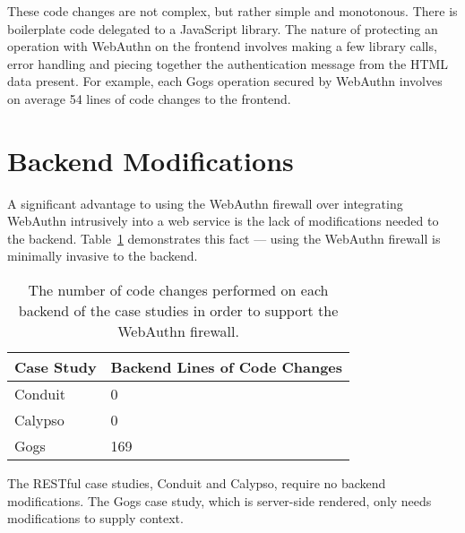 These code changes are not complex, but rather simple and monotonous. There is boilerplate code delegated to a JavaScript library. The nature of protecting an operation with WebAuthn on the frontend involves making a few library calls, error handling and piecing together the authentication message from the HTML data present. For example, each Gogs operation secured by WebAuthn involves on average 54 lines of code changes to the frontend. 




\section{Backend Modifications}\label{Sec:BackendModifications}

A significant advantage to using the WebAuthn firewall over integrating WebAuthn intrusively into a web service is the lack of modifications needed to the backend. Table~\ref{Table:EvaluationsBackendModifications} demonstrates this fact --- using the WebAuthn firewall is minimally invasive to the backend.

\begin{table}[h]
\centering

\begin{tabular}{ m{4.5cm} m{6cm}  } 
 \hline
 Case Study & Backend Lines of Code Changes \\ 
 \hline \hline

 Conduit & 0 \\ \hline

 Calypso & 0 \\ \hline

 Gogs & 169 \\ \hline

\end{tabular}
\caption{The number of code changes performed on each backend of the case studies in order to support the WebAuthn firewall.}
\label{Table:EvaluationsBackendModifications}
\end{table}

The RESTful case studies, Conduit and Calypso, require no backend modifications. The Gogs case study, which is server-side rendered, only needs modifications to supply context. 

